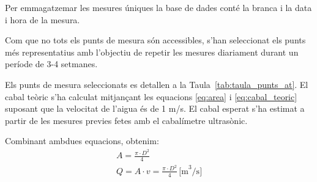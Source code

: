 \documentclass[11pt]{article}
\begin{document}
Per emmagatzemar les mesures úniques la base de dades conté la branca i la data i hora de la mesura.

Com que no tots els punts de mesura són accessibles, s'han seleccionat els punts més representatius amb l'objectiu de repetir les mesures diariament durant un període de 3-4 setmanes.

Els punts de mesura seleccionats es detallen a la Taula~\ref{tab:taula_punts_at}. El cabal teòric s'ha calculat mitjançant les equacions \ref{eq:area} i \ref{eq:cabal_teoric} suposant que la velocitat de l'aigua és de 1 m/s. El cabal esperat s'ha estimat a partir de les mesures previes fetes amb el cabalímetre ultrasònic.


Combinant ambdues equacions, obtenim:
\begin{gather}
    A = \frac{\pi \cdot D^2}{4} \label{eq:area} \\
    Q = A \cdot v = \frac{\pi \cdot D^2}{4} \, \text{[m}^3/\text{s]}
    \label{eq:cabal_teoric}
\end{gather}
\end{document}
